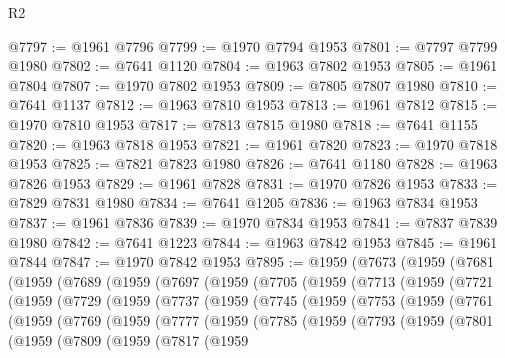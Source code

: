 \begin{lexlean}{R2}
\begin{coremodule}
@7797 := @1961 @7796
@7799 := @1970 @7794 @1953
@7801 := @7797 @7799 @1980
@7802 := @7641 @1120
@7804 := @1963 @7802 @1953
@7805 := @1961 @7804
@7807 := @1970 @7802 @1953
@7809 := @7805 @7807 @1980
@7810 := @7641 @1137
@7812 := @1963 @7810 @1953
@7813 := @1961 @7812
@7815 := @1970 @7810 @1953
@7817 := @7813 @7815 @1980
@7818 := @7641 @1155
@7820 := @1963 @7818 @1953
@7821 := @1961 @7820
@7823 := @1970 @7818 @1953
@7825 := @7821 @7823 @1980
@7826 := @7641 @1180
@7828 := @1963 @7826 @1953
@7829 := @1961 @7828
@7831 := @1970 @7826 @1953
@7833 := @7829 @7831 @1980
@7834 := @7641 @1205
@7836 := @1963 @7834 @1953
@7837 := @1961 @7836
@7839 := @1970 @7834 @1953
@7841 := @7837 @7839 @1980
@7842 := @7641 @1223
@7844 := @1963 @7842 @1953
@7845 := @1961 @7844
@7847 := @1970 @7842 @1953
@7895 := @1959
    (@7673
      (@1959
        (@7681
          (@1959
            (@7689
              (@1959
                (@7697
                  (@1959
                    (@7705
                      (@1959
                        (@7713
                          (@1959
                            (@7721
                              (@1959
                                (@7729
                                  (@1959
                                    (@7737
                                      (@1959
                                        (@7745
                                          (@1959
                                            (@7753
                                              (@1959
                                                (@7761
                                                  (@1959
                                                    (@7769
                                                      (@1959
                                                        (@7777
                                                          (@1959
                                                            (@7785
                                                              (@1959
                                                                (@7793
                                                                  (@1959
                                                                    (@7801
                                                                      (@1959
                                                                        (@7809
                                                                          (@1959
                                                                            (@7817
                                                                              (@1959

\end{coremodule}
\end{lexlean}
